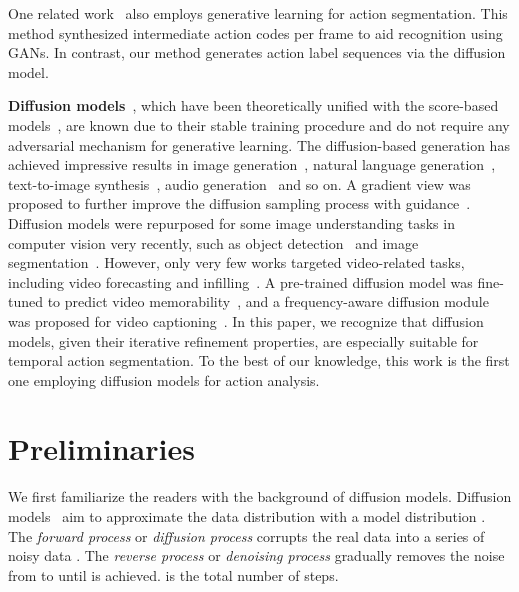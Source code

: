 \documentclass[10pt,twocolumn,letterpaper]{article}
\begin{document}
One related work~\cite{2019_WACV_Gammulle} also employs generative learning for action segmentation. 
This method synthesized intermediate action codes per frame to aid recognition using GANs. 
In contrast, our method generates action label sequences via the diffusion model.

\textbf{Diffusion models}~\cite{Therm,DiffusionSurvey,DDIM,DDPM}, which have been theoretically unified with the score-based models~\cite{score1,score2,score3}, are known due to their stable training procedure and do not require any adversarial mechanism for generative learning. 
The diffusion-based generation has achieved impressive results in image generation~\cite{BeatsGAN,LDM,2022_arXiv_Bhunia,wang2023learning}, natural language generation~\cite{yu2022latent}, text-to-image synthesis~\cite{gu2022vector,kim2021diffusionclip}, audio generation~\cite{leng2022binauralgrad,lam2022bddm} and so on.
A gradient view was proposed to further improve the diffusion sampling process with guidance~\cite{dinh2023pixelasparam}.
Diffusion models were repurposed for some image understanding tasks in computer vision very recently, such as object detection~\cite{DiffusionDet} and image segmentation~\cite{2021_ICLR_Baranchuk,SegDiff}.
However, only very few works targeted video-related tasks, including video forecasting and infilling~\cite{yang2022diffusion,hoppe2022diffusion,voleti2022masked}.
A pre-trained diffusion model was fine-tuned to predict video memorability~\cite{sweeney2022diffusing}, and a frequency-aware diffusion module was proposed for video captioning~\cite{zhong2022refined}.
In this paper, we recognize that diffusion models, given their iterative refinement properties, are especially suitable for temporal action segmentation.
To the best of our knowledge, this work is the first one employing diffusion models for action analysis.

\section{Preliminaries}

\newcommand{\mathxs}{\mathrm{x}}
\newcommand{\boldmu}{\boldsymbol{\mu}_\theta(\mathxs_{s},s)}
\newcommand{\fzpred}{f_{\theta}(\mathxs_{s},s)}

We first familiarize the readers with the background of diffusion models.
Diffusion models~\cite{DDPM, DDIM} aim to approximate the data distribution  with a model distribution .
The \textit{forward process} or \textit{diffusion process} corrupts the real data  into a series of noisy data . 
The \textit{reverse process} or \textit{denoising process} gradually removes the noise from  to  until  is achieved. 
 is the total number of steps.
\end{document}
